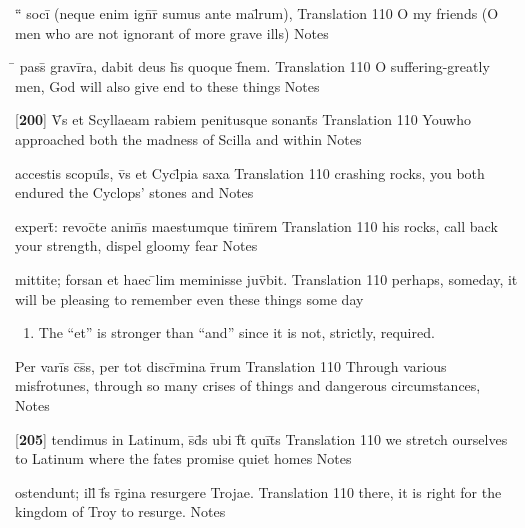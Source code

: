 \latline
  {``\={} soci\={\macron {\i}} (neque enim ign\={}r\={\macron {\i}} sumus ante mal\={}rum),}
  { Translation }
  {110}
  { O my friends (O men who are not ignorant of more grave ills) }
  { Notes }


\latline
  {\={} pass\={\macron {\i}} gravi\={}ra, dabit deus h\={\macron {\i}}s quoque f\={\macron {\i}}nem.}
  { Translation }
  {110}
  { O suffering-greatly men, God will also give end to these things }
  { Notes }


\latline
  {[\textbf{200}] V\={}s et Scyllaeam rabiem penitusque sonant\={\macron {\i}}s}
  { Translation }
  {110}
  { Youwho approached both the madness of Scilla and within }
  { Notes }


\latline
  {accestis scopul\={}s, v\={}s et Cycl\={}pia saxa }
  { Translation }
  {110}
  { crashing rocks, you both endured the Cyclops' stones and }
  { Notes }


\latline
  {expert\={\macron {\i}}:  revoc\={}te anim\={}s maestumque tim\={}rem}
  { Translation }
  {110}
  { his rocks, call back your strength, dispel gloomy fear }
  { Notes }


\latline
  {mittite; forsan et haec \={}lim meminisse juv\={}bit.}
  { Translation }
  {110}
  { perhaps, someday, it will be pleasing to remember even these things some day }
  { \begin{enumerate}
  	\item The ``et'' is stronger than ``and'' since it is not, strictly, required.  
  \end{enumerate} }


\latline
  {Per vari\={}s c\={}s\={}s, per tot discr\={\macron {\i}}mina r\={}rum}
  { Translation }
  {110}
  { Through various misfrotunes, through so many crises of things and dangerous circumstances, }
  { Notes }


\latline
  {[\textbf{205}] tendimus in Latinum, s\={}d\={}s ubi f\={}t\={} qui\={}t\={}s}
  { Translation }
  {110}
  { we stretch ourselves to Latinum where the fates promise quiet homes }
  { Notes }


\latline
  {ostendunt; ill\={\macron {\i}} f\={}s r\={}gina resurgere Trojae.}
  { Translation }
  {110}
  { there, it is right for the kingdom of Troy to resurge. }
  { Notes }


